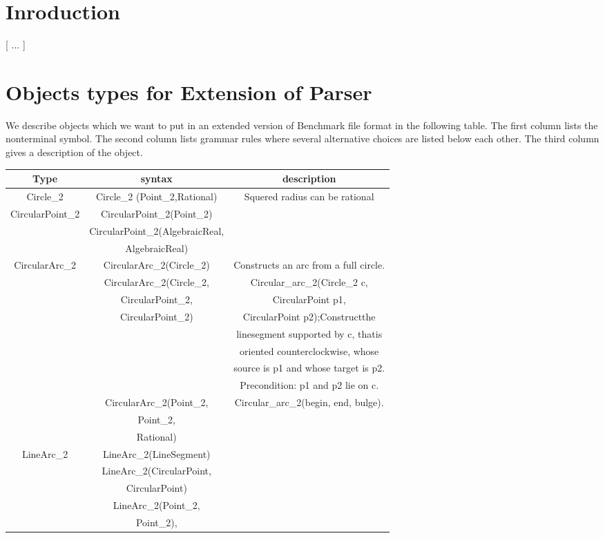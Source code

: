 \documentclass[10pt]{article}
\begin{document}
\section{Inroduction}
 [ ... ]
\section{Objects types for Extension of Parser}

 We describe objects which we want to put in an extended version of Benchmark file format in the following table. The first column lists the nonterminal symbol. The second column lists grammar rules where several alternative choices are listed below each other. The third column gives a description of the object.

\begin{tabular}{|c|c|c|}  \hline Type & syntax & description  \\ \hline
\hline\hline
Circle\_2 & Circle\_2 (Point\_2,Rational) & Squered radius can be rational\\
\hline
CircularPoint\_2 &  CircularPoint\_2(Point\_2)     &\\
              &  CircularPoint\_2(AlgebraicReal,&\\
	      &  AlgebraicReal) 	     &\\
\hline
 CircularArc\_2  &  CircularArc\_2(Circle\_2) &  Constructs an arc from a full circle. \\
		 &CircularArc\_2(Circle\_2,	  &Circular\_arc\_2(Circle\_2 c,\\
		 &CircularPoint\_2,		  &CircularPoint p1,  \\
		 &CircularPoint\_2)		  &CircularPoint p2);Constructthe\\
		 &				  &linesegment supported by c, thatis \\
		 &				  &oriented counterclockwise, whose \\
		 &				  &source is p1 and whose target is p2.\\
		 &				  &Precondition: p1 and p2 lie on c.\\
	         &CircularArc\_2(Point\_2,      &Circular\_arc\_2(begin, end, bulge).\\
		 &Point\_2,			  &\\
		 &Rational) 			  &\\
\hline
 LineArc\_2  & LineArc\_2(LineSegment)        &\\
	       &  LineArc\_2(CircularPoint,	  &\\
	       &  CircularPoint)	          &\\
 	       & LineArc\_2(Point\_2, 	  &\\
	       &  Point\_2),          	          &\\

\hline
\end{tabular}
\end{document}

